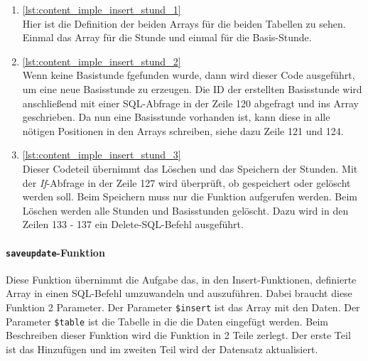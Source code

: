 \begin{enumerate}
	\item \autoref{lst:content_imple_insert_stund_1}\\
	Hier ist die Definition der beiden Arrays für die beiden Tabellen zu sehen. Einmal das Array für die Stunde und einmal für die Basis-Stunde.
	
	
	
	\item \autoref{lst:content_imple_insert_stund_2}\\
	Wenn keine Basistunde fgefunden wurde, dann wird dieser Code ausgeführt, um eine neue Basisstunde zu erzeugen. Die ID der erstellten Basisstunde wird anschließend mit einer SQL-Abfrage in der Zeile 120 abgefragt und ins Array geschrieben. Da nun eine Basisstunde vorhanden ist, kann diese in alle nötigen Positionen in den Arrays schreiben, siehe dazu Zeile 121 und 124.
	
	
	
	\item \autoref{lst:content_imple_insert_stund_3}\\
	Dieser Codeteil übernimmt das Löschen und das Speichern der Stunden. Mit der \textit{If}-Abfrage in der Zeile 127 wird überprüft, ob gespeichert oder gelöscht werden soll. Beim Speichern muss nur die Funktion aufgerufen werden. Beim Löschen werden alle Stunden und Basisstunden gelöscht. Dazu wird in den Zeilen 133 - 137 ein Delete-SQL-Befehl ausgeführt.
	
		
	
\end{enumerate}

\paragraph{\texttt{saveupdate}-Funktion}
\label{sec:content_imple_saveupdate}
$ ~~ $\\
Diese Funktion übernimmt die Aufgabe das, in den Insert-Funktionen, definierte Array in einen SQL-Befehl umzuwandeln und auszuführen. Dabei braucht diese Funktion 2 Parameter. Der Parameter \texttt{\$insert} ist das Array mit den Daten. Der Parameter \texttt{\$table} ist die Tabelle in die die Daten eingefügt werden. Beim Beschreiben dieser Funktion wird die Funktion in 2 Teile zerlegt. Der erste Teil ist das Hinzufügen und im zweiten Teil wird der Datensatz aktualisiert.\\

